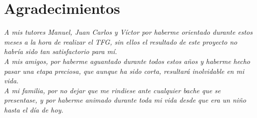 \pagestyle{plain}
\chapter*{Agradecimientos}

{\it 
A mis tutores Manuel, Juan Carlos y Víctor por haberme orientado durante estos meses a la hora de realizar el TFG, sin ellos el resultado de este proyecto no habría sido tan satisfactorio para mí.
\\

A mis amigos, por haberme aguantado durante todos estos años y haberme hecho pasar una etapa preciosa, que aunque ha sido corta, resultará inolvidable en mi vida.
\\

A mi familia, por no dejar que me rindiese ante cualquier bache que se presentase, y por haberme animado durante toda mi vida desde que era un niño hasta el día de hoy.
}